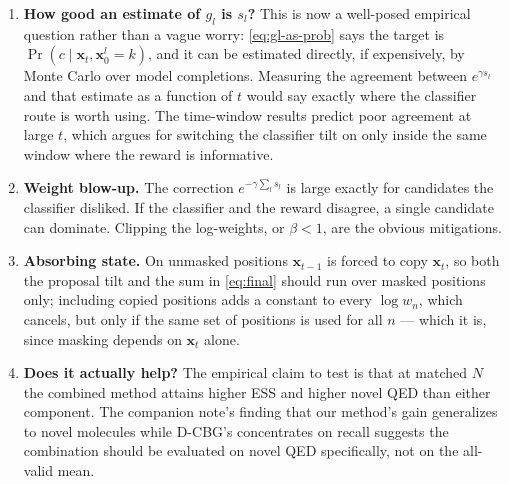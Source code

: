 \documentclass[11pt]{article}
\newcommand{\x}{\mathbf{x}}
\begin{document}
\begin{enumerate}
  \item \textbf{How good an estimate of $g_l$ is $s_l$?} This is now a
        well-posed empirical question rather than a vague worry:
        \eqref{eq:gl-as-prob} says the target is
        $\Pr(c \mid \x_t, \x_0^l = k)$, and it can be estimated directly, if
        expensively, by Monte Carlo over model completions. Measuring the
        agreement between $e^{\gamma s_l}$ and that estimate as a function of
        $t$ would say exactly where the classifier route is worth using. The
        time-window results predict poor agreement at large $t$, which argues
        for switching the classifier tilt on only inside the same window where
        the reward is informative.
  \item \textbf{Weight blow-up.} The correction $e^{-\gamma \sum_l s_l}$ is
        large exactly for candidates the classifier disliked. If the classifier
        and the reward disagree, a single candidate can dominate. Clipping the
        log-weights, or $\beta < 1$, are the obvious mitigations.
  \item \textbf{Absorbing state.} On unmasked positions $\x_{t-1}$ is forced to
        copy $\x_t$, so both the proposal tilt and the sum in \eqref{eq:final}
        should run over masked positions only; including copied positions adds
        a constant to every $\log w_n$, which cancels, but only if the same set
        of positions is used for all $n$ --- which it is, since masking depends
        on $\x_t$ alone.
  \item \textbf{Does it actually help?} The empirical claim to test is that at
        matched $N$ the combined method attains higher ESS and higher novel QED
        than either component. The companion note's finding that our method's
        gain generalizes to novel molecules while D-CBG's concentrates on
        recall suggests the combination should be evaluated on novel QED
        specifically, not on the all-valid mean.
\end{enumerate}
\end{document}
